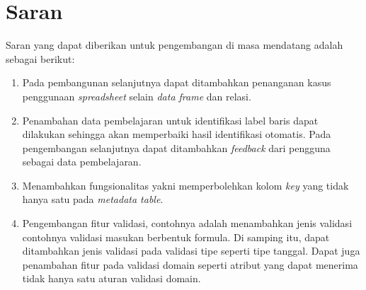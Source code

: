 \section{Saran}
Saran yang dapat diberikan untuk pengembangan di masa mendatang adalah sebagai berikut:
\begin{enumerate}
	\item Pada pembangunan selanjutnya dapat ditambahkan penanganan kasus penggunaan \textit{spreadsheet} selain \textit{data frame} dan relasi.
	\item Penambahan data pembelajaran untuk identifikasi label baris dapat dilakukan sehingga akan memperbaiki hasil identifikasi otomatis. Pada pengembangan selanjutnya dapat ditambahkan \textit{feedback} dari pengguna sebagai data pembelajaran.
	\item Menambahkan fungsionalitas yakni memperbolehkan kolom \textit{key} yang tidak hanya satu pada \textit{metadata table}.
	\item Pengembangan fitur validasi, contohnya adalah menambahkan jenis validasi contohnya validasi masukan berbentuk formula. Di samping itu, dapat ditambahkan jenis validasi pada validasi tipe seperti tipe tanggal. Dapat juga penambahan fitur pada validasi domain seperti atribut yang dapat menerima tidak hanya satu aturan validasi domain.
\end{enumerate}